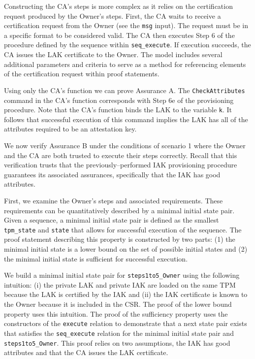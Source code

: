 \documentclass[runningheads]{llncs}
\begin{document}
Constructing the CA's steps is more complex as it relies on the
certification request produced by the Owner's steps. First, the CA
waits to receive a certification request from the Owner (see the
\verb|msg| input). The request must be in a specific format to be
considered valid. The CA then executes Step 6 of the procedure defined
by the sequence within \verb|seq_execute|. If execution succeeds, the
CA issues the LAK certificate to the Owner.  The model includes
several additional parameters and criteria to serve as a method for
referencing elements of the certification request within proof
statements.

Using only the CA's function we can prove Assurance A. The
\verb|CheckAttributes| command in the CA's function corresponds with
Step 6e of the provisioning procedure.  Note that the CA's function
binds the LAK to the variable \verb|k|. It follows that successful
execution of this command implies the LAK has all of the attributes
required to be an attestation key.

We now verify Assurance B under the conditions of scenario 1 where the
Owner and the CA are both trusted to execute their steps
correctly. Recall that this verification trusts that the
previously--performed IAK provisioning procedure guarantees its
associated assurances, specifically that the IAK has good attributes.

First, we examine the Owner's steps and associated requirements. These
requirements can be quantitatively described by a minimal initial
state pair. Given a sequence, a minimal initial state pair is defined
as the smallest \verb|tpm_state| and \verb|state| that allows for
successful execution of the sequence. The proof statement describing
this property is constructed by two parts: (1) the minimal initial
state is a lower bound on the set of possible initial states and (2)
the minimal initial state is sufficient for successful execution.

We build a minimal initial state pair for \verb|steps1to5_Owner| using
the following intuition: (i) the private LAK and private IAK are
loaded on the same TPM because the LAK is certified by the IAK and
(ii) the IAK certificate is known to the Owner because it is included
in the CSR.  The proof of the lower bound property uses this
intuition.  The proof of the sufficiency property uses the
constructors of the \verb|execute| relation to demonstrate that a next
state pair exists that satisfies the \verb|seq_execute| relation for
the minimal initial state pair and \verb|steps1to5_Owner|. This proof
relies on two assumptions, the IAK has good attributes and that the CA
issues the LAK certificate.
\end{document}
